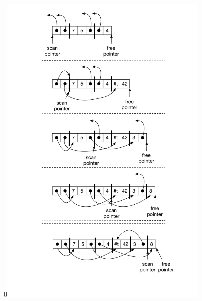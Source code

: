 \documentclass[7x10]{TimesAPriori_MIT}%
\def\racketEd{0}
\def\edition{0}
\newcommand{\racket}[1]{{\if\edition\racketEd{#1}\fi}}
\numberwithin{theorem}{chapter}
\numberwithin{definition}{chapter}
\numberwithin{equation}{chapter}
\begin{document}
\begin{figure}[tbp]
\centering
\begin{tcolorbox}[colback=white]
  \racket{\includegraphics[width=0.9\textwidth]{figs/cheney}}

\end{tcolorbox}
\end{figure}
\end{document}
